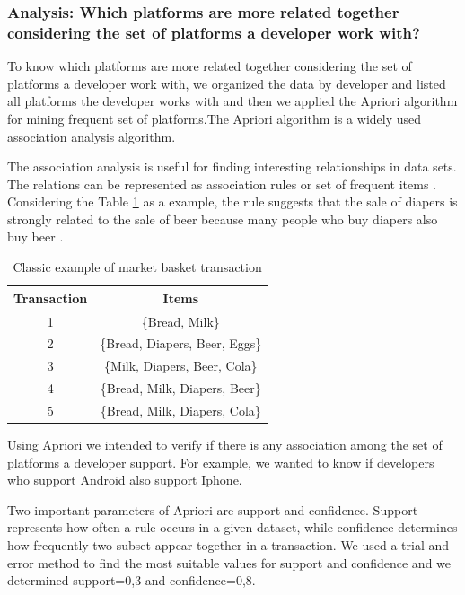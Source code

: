 \documentclass[10pt, conference]{IEEEtran}
\begin{document}
\subsubsection{Analysis: Which platforms are more related together considering the set of platforms a developer work with? }
\label{met_analysis3}

To know which platforms are more related together considering the set of platforms a developer work with, we organized the data by developer and listed all platforms the developer works with and then we applied the Apriori algorithm for mining frequent set of platforms.The Apriori algorithm is a widely used association analysis algorithm. 

The association analysis is useful for finding interesting relationships in data  sets. The relations can be represented as association rules or set of frequent items \cite{Tan2005}. Considering the Table \ref{examplerule} as a example, the rule suggests that the sale of diapers is strongly related to the sale of beer because many people who buy diapers also buy beer \cite{Tan2005}.   
\begin{table}[h]
\renewcommand{\arraystretch}{1.3}
\caption{Classic example of market basket transaction}
\label{examplerule}
\centering
\begin{tabular}{|c|c|}
\hline
 Transaction & Items \\
\hline
1&		\{Bread, Milk\}\\
2&		\{Bread, Diapers, Beer, Eggs\}\\
3&		\{Milk, Diapers, Beer, Cola\}\\
4&		\{Bread, Milk, Diapers, Beer\}\\
5&		\{Bread, Milk, Diapers, Cola\}\\
\hline
\end{tabular}
\end{table}



Using Apriori we intended to verify if there is any association among the set of platforms a developer support. For example, we wanted to know if developers who support Android also support Iphone.


Two important parameters of Apriori are support and confidence. Support represents how often a rule occurs in a given dataset, while confidence determines how frequently two subset appear together in a transaction. We used a trial and error method to find the most suitable values for support and confidence and we determined support=0,3 and confidence=0,8.     
\end{document}
